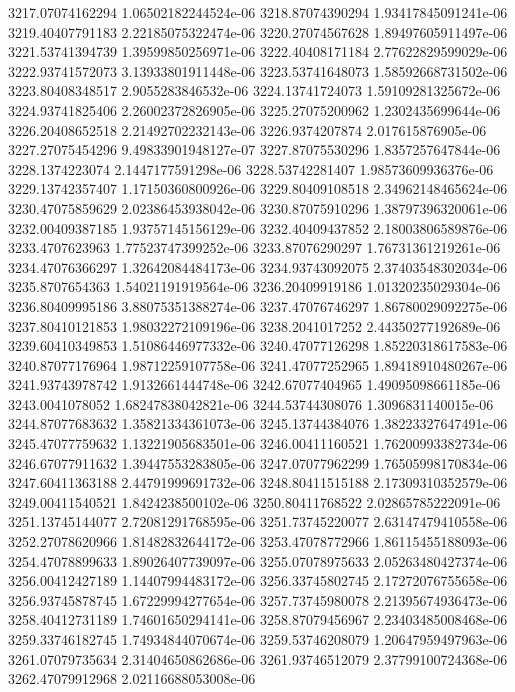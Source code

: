 {3217.07074162294 1.06502182244524e-06
3218.87074390294 1.93417845091241e-06
3219.40407791183 2.22185075322474e-06
3220.27074567628 1.89497605911497e-06
3221.53741394739 1.39599850256971e-06
3222.40408171184 2.77622829599029e-06
3222.93741572073 3.13933801911448e-06
3223.53741648073 1.58592668731502e-06
3223.80408348517 2.9055283846532e-06
3224.13741724073 1.59109281325672e-06
3224.93741825406 2.26002372826905e-06
3225.27075200962 1.2302435699644e-06
3226.20408652518 2.21492702232143e-06
3226.9374207874 2.017615876905e-06
3227.27075454296 9.49833901948127e-07
3227.87075530296 1.8357257647844e-06
3228.1374223074 2.1447177591298e-06
3228.53742281407 1.98573609936376e-06
3229.13742357407 1.17150360800926e-06
3229.80409108518 2.34962148465624e-06
3230.47075859629 2.02386453938042e-06
3230.87075910296 1.38797396320061e-06
3232.00409387185 1.93757145156129e-06
3232.40409437852 2.18003806589876e-06
3233.4707623963 1.77523747399252e-06
3233.87076290297 1.76731361219261e-06
3234.47076366297 1.32642084484173e-06
3234.93743092075 2.37403548302034e-06
3235.8707654363 1.54021191919564e-06
3236.20409919186 1.01320235029304e-06
3236.80409995186 3.88075351388274e-06
3237.47076746297 1.86780029092275e-06
3237.80410121853 1.98032272109196e-06
3238.2041017252 2.44350277192689e-06
3239.60410349853 1.51086446977332e-06
3240.47077126298 1.85220318617583e-06
3240.87077176964 1.98712259107758e-06
3241.47077252965 1.89418910480267e-06
3241.93743978742 1.9132661444748e-06
3242.67077404965 1.49095098661185e-06
3243.0041078052 1.68247838042821e-06
3244.53744308076 1.3096831140015e-06
3244.87077683632 1.35821334361073e-06
3245.13744384076 1.38223327647491e-06
3245.47077759632 1.13221905683501e-06
3246.00411160521 1.76200993382734e-06
3246.67077911632 1.39447553283805e-06
3247.07077962299 1.76505998170834e-06
3247.60411363188 2.44791999691732e-06
3248.80411515188 2.17309310352579e-06
3249.00411540521 1.8424238500102e-06
3250.80411768522 2.02865785222091e-06
3251.13745144077 2.72081291768595e-06
3251.73745220077 2.63147479410558e-06
3252.27078620966 1.81482832644172e-06
3253.47078772966 1.86115455188093e-06
3254.47078899633 1.89026407739097e-06
3255.07078975633 2.05263480427374e-06
3256.00412427189 1.14407994483172e-06
3256.33745802745 2.17272076755658e-06
3256.93745878745 1.67229994277654e-06
3257.73745980078 2.21395674936473e-06
3258.40412731189 1.74601650294141e-06
3258.87079456967 2.23403485008468e-06
3259.33746182745 1.74934844070674e-06
3259.53746208079 1.20647959497963e-06
3261.07079735634 2.31404650862686e-06
3261.93746512079 2.37799100724368e-06
3262.47079912968 2.02116688053008e-06
}
